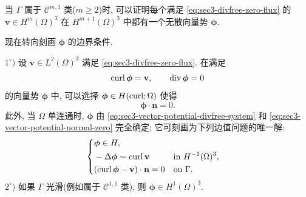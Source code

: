 \setcounter{statement}{12}
\begin{Remark}\label{rem:sec3-high-order-potential-regularity}
当 $\Gamma$ 属于 $\mathcal C^{m,1}$ 类($m\ge2$)时, 可以证明每个满足
\eqref{eq:sec3-divfree-zero-flux} 的 $\mathbf v\in H^m(\Omega)^3$
在 $H^{m+1}(\Omega)^3$ 中都有一个无散向量势 $\boldsymbol\phi$.
\end{Remark}

现在转向刻画 $\boldsymbol\phi$ 的边界条件.

\setcounter{statement}{4}
\begin{Theorem}\label{thm:sec3-normal-zero-vector-potential}
$1^\circ)$ 设 $\mathbf v\in L^2(\Omega)^3$ 满足
\eqref{eq:sec3-divfree-zero-flux}. 在满足
\begin{equation}\label{eq:sec3-vector-potential-divfree-system}
\operatorname{curl}\boldsymbol\phi=\mathbf v,
\qquad
\operatorname{div}\boldsymbol\phi=0
\end{equation}
的向量势 $\boldsymbol\phi$ 中, 可以选择
$\boldsymbol\phi\in H(\operatorname{curl};\Omega)$ 使得
\begin{equation}\label{eq:sec3-vector-potential-normal-zero}
\boldsymbol\phi\cdot\mathbf n=0.
\end{equation}
此外, 当 $\Omega$ 单连通时, $\boldsymbol\phi$ 由
\eqref{eq:sec3-vector-potential-divfree-system} 和
\eqref{eq:sec3-vector-potential-normal-zero} 完全确定; 它可刻画为下列边值问题的唯一解:
\begin{equation}\label{eq:sec3-normal-zero-potential-boundary-problem}
\left\{\begin{aligned}
&\boldsymbol\phi\in H,\\
&-\Delta\boldsymbol\phi=\operatorname{curl}\mathbf v
&&\text{in }H^{-1}(\Omega)^3,\\
&(\operatorname{curl}\boldsymbol\phi-\mathbf v)\cdot\mathbf n=0
&&\text{on }\Gamma.
\end{aligned}\right.
\end{equation}
$2^\circ)$ 如果 $\Gamma$ 光滑(例如属于 $\mathcal C^{1,1}$ 类),
则 $\boldsymbol\phi\in H^1(\Omega)^3$.
\end{Theorem}

